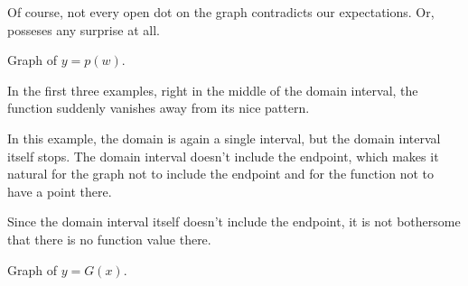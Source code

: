 \documentclass{ximera}
\begin{document}
Of course, not every open dot on the graph contradicts our expectations. Or, posseses any surprise at all.






Graph of $y = p(w)$.

\begin{image}
\end{image}








In the first three examples, right in the middle of the domain interval, the function suddenly vanishes away from its nice pattern. 

In this example, the domain is again a single interval, but the domain interval itself stops. The domain interval doesn’t include the endpoint, which makes it natural for the graph not to include the endpoint and for the function not to have a point there.

Since the domain interval itself doesn't include the endpoint, it is not bothersome that there is no function value there.








 
Graph of $y = G(x)$.
 
\end{document}
